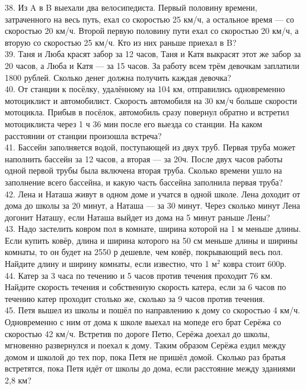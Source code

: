 38. Из A в B выехали два велосипедиста. Первый половину времени, затраченного на весь путь, ехал со скоростью 25 км/ч, а остальное время --- со скоростью 20 км/ч. Второй первую половину пути ехал со скоростью 20 км/ч, а вторую со скоростью 25 км/ч. Кто из них раньше приехал в B?\\
39. Таня и Люба красят забор за 12 часов, Таня и Катя выкрасят этот же забор за 20 часов, а Люба и Катя --- за 15 часов. За работу всем трём девочкам заплатили 1800 рублей. Сколько денег должна получить каждая девочка?\\
40. От станции к посёлку, удалённому на 104 км, отправились одновременно мотоциклист и автомобилист. Скорость автомобиля на 30 км/ч больше скорости мотоцикла. Прибыв в посёлок, автомобиль сразу повернул обратно и встретил мотоциклиста через 1 ч 36 мин после его выезда со станции. На каком расстоянии от станции произошла встреча?\\
41. Бассейн заполняется водой, поступающей из двух труб. Первая труба может наполнить бассейн за 12 часов, а вторая --- за 20ч. После двух часов работы одной первой трубы была включена вторая труба. Сколько времени ушло на заполнение всего бассейна, и какую часть бассейна заполнила первая труба?\\
42. Лена и Наташа живут в одном доме и учатся в одной школе. Лена доходит от дома до школы за 20 минут, а Наташа --- за 30 минут. Через сколько минут Лена догонит Наташу, если Наташа выйдет из дома на 5 минут раньше Лены?\\
43. Надо застелить ковром пол в комнате, ширина которой на 1 м меньше длины. Если купить ковёр, длина и ширина которого на 50 см меньше длины и ширины комнаты, то он будет на 2550 р дешевле, чем ковёр, покрывающий весь пол. Найдите длину и ширину комнаты, если известно, что 1 $\text{м}^2$ ковра стоит 600р.\\
44. Катер за 3 часа по течению и 5 часов против течения проходит 76 км. Найдите скорость течения и собственную скорость катера, если за 6 часов по течению катер проходит столько же, сколько за 9 часов против течения.\\
45. Петя вышел из школы и пошёл по направлению к дому со скоростью 4 км/ч. Одновременно с ним от дома к школе выехал на мопеде его брат Серёжа со скоростью 42 км/ч. Встретив по дороге Петю, Серёжа доехал до школы, мгновенно развернулся и поехал к дому. Таким образом Серёжа ездил между домом и школой до тех пор, пока Петя не пришёл домой. Сколько раз братья встретятся, пока Петя идёт от школы до дома, если расстояние между зданиями 2,8 км?\\
